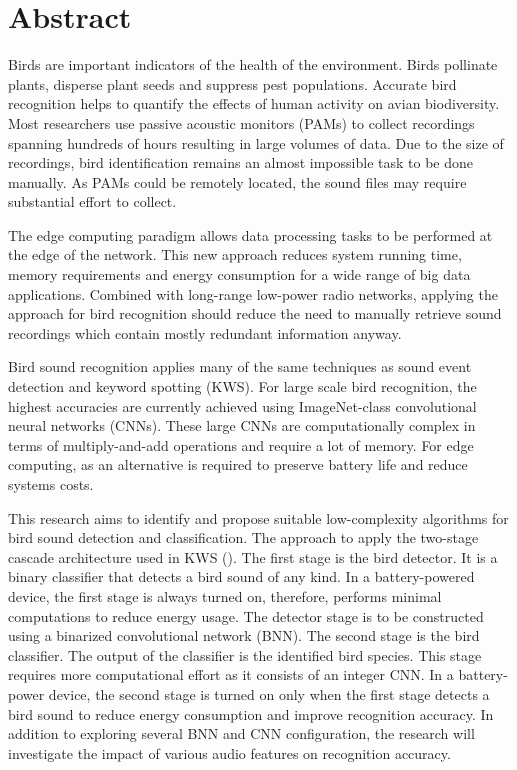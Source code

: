 \chapter*{Abstract} 


Birds are important indicators of the health of the environment. Birds pollinate plants, disperse plant seeds and suppress pest populations. Accurate bird recognition helps to quantify the effects of human activity on avian biodiversity. Most researchers use passive acoustic monitors (PAMs) to collect recordings spanning hundreds of hours resulting in large volumes of data. Due to the size of recordings, bird identification remains an almost impossible task to be done manually. As PAMs could be remotely located, the sound files may require substantial effort to collect.

The edge computing paradigm allows data processing tasks to be performed at the edge of the network. This new approach reduces system running time, memory requirements and energy consumption for a wide range of big data applications. Combined with long-range low-power radio networks, applying the approach for bird recognition should reduce the need to manually retrieve sound recordings which contain mostly redundant information anyway.

Bird sound recognition applies many of the same techniques as sound event detection and keyword spotting (KWS). For large scale bird recognition, the highest accuracies are currently achieved using ImageNet-class convolutional neural networks (CNNs). These large CNNs are computationally complex in terms of multiply-and-add operations and require a lot of memory. For edge computing, as an alternative is required to preserve battery life and reduce systems costs.

This research aims to identify and propose suitable low-complexity algorithms for bird sound detection and classification. The approach to apply the two-stage cascade architecture used in KWS (\cite{Sigtia2018}). The first stage is the bird detector. It is a binary classifier that detects a bird sound of any kind. In a battery-powered device, the first stage is always turned on, therefore, performs minimal computations to reduce energy usage. The detector stage is to be constructed using a binarized convolutional network (BNN). The second stage is the bird classifier. The output of the classifier is the identified bird species. This stage requires more computational effort as it consists of an integer CNN. In a battery-power device, the second stage is turned on only when the first stage detects a bird sound to reduce energy consumption and improve recognition accuracy. In addition to exploring several BNN and CNN configuration, the research will investigate the impact of various audio features on recognition accuracy.

